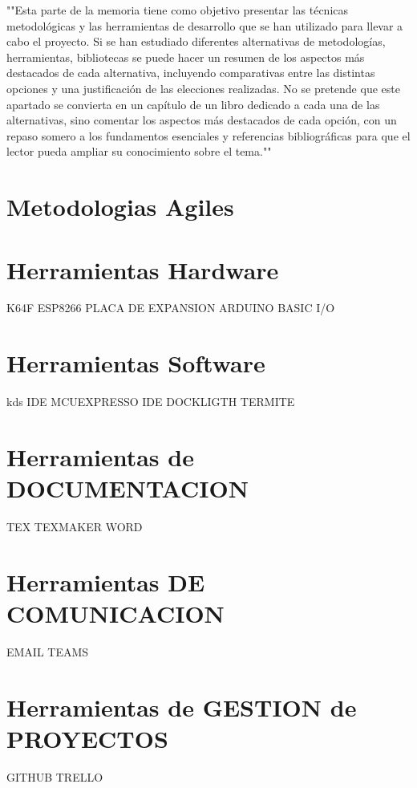 
""Esta parte de la memoria tiene como objetivo presentar las técnicas metodológicas y las herramientas de desarrollo que se han utilizado para llevar a cabo el proyecto. Si se han estudiado diferentes alternativas de metodologías, herramientas, bibliotecas se puede hacer un resumen de los aspectos más destacados de cada alternativa, incluyendo comparativas entre las distintas opciones y una justificación de las elecciones realizadas. 
No se pretende que este apartado se convierta en un capítulo de un libro dedicado a cada una de las alternativas, sino comentar los aspectos más destacados de cada opción, con un repaso somero a los fundamentos esenciales y referencias bibliográficas para que el lector pueda ampliar su conocimiento sobre el tema.""

\section{Metodologias Agiles}

\section{Herramientas Hardware}

K64F
ESP8266
PLACA DE EXPANSION ARDUINO BASIC I/O

\section{Herramientas Software}

kds IDE
MCUEXPRESSO IDE
DOCKLIGTH
TERMITE

\section{Herramientas de DOCUMENTACION}
TEX
TEXMAKER
WORD

\section{Herramientas DE COMUNICACION}
EMAIL
TEAMS

\section{Herramientas de GESTION de PROYECTOS}

GITHUB
TRELLO



